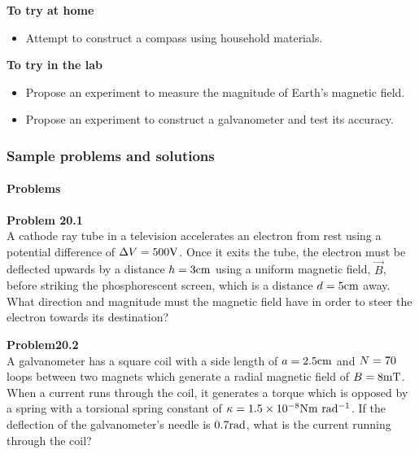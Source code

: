 \begin{framed}
\textbf{To try at home}\\
\begin{itemize}
\item Attempt to construct a compass using household materials.
\end{itemize}
\end{framed}

\begin{framed}
\textbf{To try in the lab}\\
\begin{itemize}
\item Propose an experiment to measure the magnitude of Earth's magnetic field.
\item Propose an experiment to construct a galvanometer and test its accuracy.
\end{itemize}
\end{framed}

\subsubsection{Sample problems and solutions}

\paragraph{Problems}

\begin{framed}
\textbf{Problem 20.1}\\
A cathode ray tube in a television accelerates an electron from rest using a potential difference of $\Delta V=500 {\rm V}$. Once it exits the tube, the electron must be deflected upwards by a distance $h=3 {\rm cm}$ using a uniform magnetic field, $\vec B$, before striking the phosphorescent screen, which is a distance $d= 5 {\rm cm}$ away. What direction and magnitude must the magnetic field have in order to steer the electron towards its destination?
\end{framed}

\begin{framed}
\textbf{Problem20.2}\\
A galvanometer has a square coil with a side length of $a=2.5 {\rm cm}$ and $N=70 {\rm }$ loops between two magnets which generate a radial magnetic field of $B=8 {\rm mT}$. When a current runs through the coil, it generates a torque which is opposed by a spring with a torsional spring constant of $\kappa = 1.5\times 10^{ -8} {\rm Nm~rad^{ -1}}$. If the deflection of the galvanometer's needle is $0.7 {\rm rad}$, what is the current running through the coil?
\end{framed}

